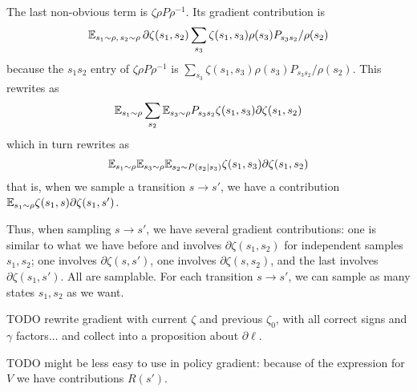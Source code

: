 \documentclass[11pt,a4paper]{article}
\newcommand{\ztar}{z^\mathrm{tar}}
\begin{document}
The last non-obvious term is $\zeta\rho P \rho^{-1}$. Its gradient
contribution is
\begin{equation}
\mathbb{E}_{s_1\sim \rho,\,s_2\sim \rho} \,\partial \zeta(s_1,s_2)\sum_{s_3}
\zeta(s_1,s_3)\rho(s_3)P_{s_3s_2}/\rho(s_2)
\end{equation}
because the $s_1s_2$ entry of $\zeta\rho P \rho^{-1}$ is $\sum_{s_3}
\zeta(s_1,s_3)\rho(s_3)P_{s_3s_2}/\rho(s_2)$. This rewrites as
\begin{equation}
\mathbb{E}_{s_1\sim \rho}\sum_{s_2} \mathbb{E}_{s_3\sim\rho} P_{s_3s_2}
\zeta(s_1,s_3)\partial\zeta(s_1,s_2)
\end{equation}
which in turn rewrites as
\begin{equation}
\mathbb{E}_{s_1\sim \rho}\mathbb{E}_{s_3\sim\rho} \mathbb{E}_{s_2\sim P(s_2|s_3)}
\zeta(s_1,s_3)\partial\zeta(s_1,s_2)
\end{equation}
that is, when we sample a transition $s\to s'$, we have a contribution
$\mathbb{E}_{s_1\sim \rho}\zeta(s_1,s)\partial \zeta(s_1,s')$.

Thus, when sampling $s\to s'$, we have several gradient contributions:
one is similar to what we have before and involves
$\partial\zeta(s_1,s_2)$ for independent samples $s_1,s_2$; one involves
$\partial\zeta(s,s')$, one involves $\partial\zeta(s,s_2)$, and the last
involves $\partial\zeta(s_1,s')$. All are samplable. For each transition
$s\to s'$, we can
sample as many states $s_1,s_2$ as we want.

TODO rewrite gradient with current $\zeta$ and previous $\zeta_0$, with
all correct signs and $\gamma$ factors... and collect into a proposition
about $\partial \ell$.

TODO might be less easy to use in policy gradient: because of the
expression for $V$ we have contributions $R(s')$.

\end{document}

